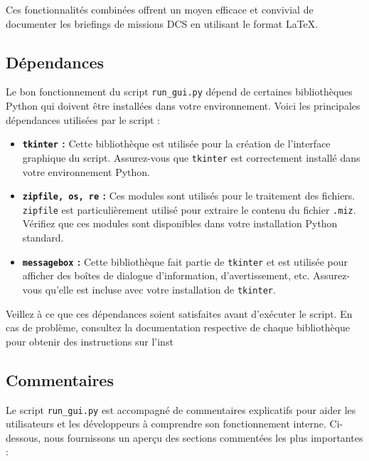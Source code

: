 \documentclass{article}
\begin{document}
Ces fonctionnalités combinées offrent un moyen efficace et convivial de documenter les briefings de missions DCS en utilisant le format LaTeX.


\subsection{Dépendances}

Le bon fonctionnement du script \texttt{run\_gui.py} dépend de certaines bibliothèques Python qui doivent être installées dans votre environnement. Voici les principales dépendances utilisées par le script :

\begin{itemize}
    \item \textbf{\texttt{tkinter} :} Cette bibliothèque est utilisée pour la création de l'interface graphique du script. Assurez-vous que \texttt{tkinter} est correctement installé dans votre environnement Python.

    \item \textbf{\texttt{zipfile, os, re} :} Ces modules sont utilisés pour le traitement des fichiers. \texttt{zipfile} est particulièrement utilisé pour extraire le contenu du fichier \texttt{.miz}. Vérifiez que ces modules sont disponibles dans votre installation Python standard.

    \item \textbf{\texttt{messagebox} :} Cette bibliothèque fait partie de \texttt{tkinter} et est utilisée pour afficher des boîtes de dialogue d'information, d'avertissement, etc. Assurez-vous qu'elle est incluse avec votre installation de \texttt{tkinter}.
\end{itemize}

Veillez à ce que ces dépendances soient satisfaites avant d'exécuter le script. En cas de problème, consultez la documentation respective de chaque bibliothèque pour obtenir des instructions sur l'inst

\subsection{Commentaires}

Le script \texttt{run\_gui.py} est accompagné de commentaires explicatifs pour aider les utilisateurs et les développeurs à comprendre son fonctionnement interne. Ci-dessous, nous fournissons un aperçu des sections commentées les plus importantes :
\end{document}
